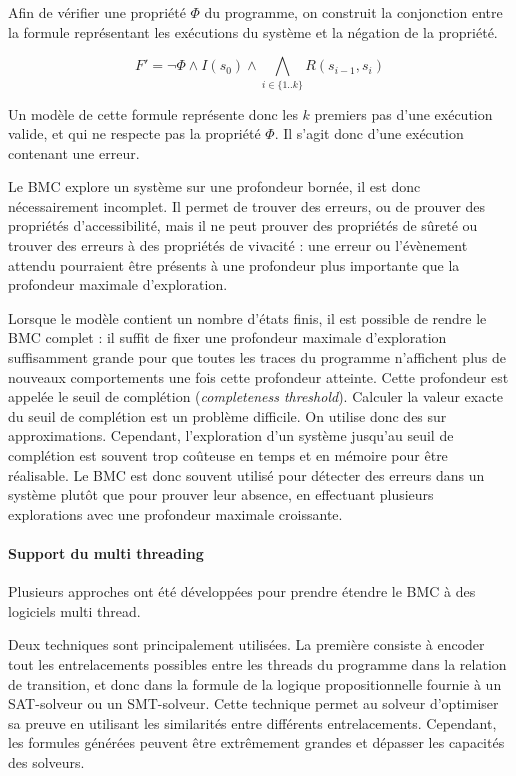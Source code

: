 Afin de vérifier une propriété \(\Phi\) du programme, on construit la
conjonction entre la formule représentant les exécutions du système et la
négation de la propriété.

\[
F' = \lnot \Phi \land I(s_0) \land \bigwedge_{i\in \{1..k\}} R(s_{i-1}, s_i)
\]

Un modèle de cette formule représente donc les \(k\) premiers pas d'une
exécution valide, et qui ne respecte pas la propriété \(\Phi\). Il s'agit donc
d'une exécution contenant une erreur.

Le \ac{BMC} explore un système sur une profondeur bornée, il est donc nécessairement
incomplet. Il permet de trouver des erreurs, ou de prouver des propriétés
d'accessibilité, mais il ne peut prouver des propriétés de sûreté ou trouver des
erreurs à des propriétés de vivacité : une erreur ou l'évènement attendu
pourraient être présents à une profondeur plus importante que la profondeur
maximale d'exploration.

Lorsque le modèle contient un nombre d'états finis, il est possible de rendre le
\ac{BMC} complet : il suffit de fixer une profondeur maximale d'exploration
suffisamment grande pour que toutes les traces du programme n'affichent plus de
nouveaux comportements une fois cette profondeur atteinte. Cette profondeur est appelée le seuil de
complétion (\emph{completeness threshold}). Calculer la valeur exacte du seuil de
complétion est un problème difficile. On utilise donc des sur approximations.
Cependant, l'exploration d'un système jusqu'au seuil de complétion est souvent
trop coûteuse en temps et en mémoire pour être réalisable. Le \ac{BMC} est donc
souvent utilisé pour détecter des erreurs dans un système plutôt que pour
prouver leur absence, en effectuant plusieurs explorations avec une profondeur
maximale croissante.

\paragraph{Support du multi threading}

Plusieurs approches ont été développées pour prendre étendre le \ac{BMC} à des
logiciels multi thread\cite{ESBMC_multithread}.

Deux techniques sont principalement utilisées.
La première consiste à encoder tout les entrelacements possibles entre les threads
du programme dans la relation de transition, et donc dans la formule de la
logique propositionnelle fournie à un SAT-solveur ou un SMT-solveur. Cette
technique permet au solveur d'optimiser sa preuve en utilisant les similarités
entre différents entrelacements. Cependant, les formules générées peuvent être
extrêmement grandes et dépasser les capacités des solveurs.

